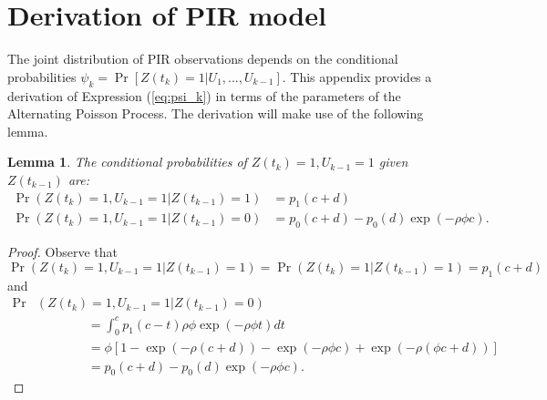 \documentclass[man, noextraspace, floatsintext]{apa6}\usepackage[]{graphicx}\usepackage[]{color}
\newcommand{\bibfile}{C:/Users/jep2963/Documents/Bibliography/Behavioral_observation-APP}
\newtheorem{lemma}{Lemma}
\begin{document}


 
\appendix

\section{Derivation of PIR model}
\label{app:PIR_derivation}

The joint distribution of PIR observations depends on the conditional probabilities $\psi_k = \Pr\left[ Z(t_k) = 1 \left| U_1,...,U_{k-1}\right.\right]$. 
This appendix provides a derivation of Expression (\ref{eq:psi_k}) in terms of the parameters of the Alternating Poisson Process. The derivation will make use of the following lemma.

\begin{lemma}
\label{lemma1}
The conditional probabilities of $Z(t_k) = 1, U_{k-1} = 1$ given $Z(t_{k-1})$ are:
\begin{align*}
\Pr\left(Z(t_k) = 1, U_{k-1} = 1 \left| Z(t_{k-1}) = 1 \right.\right) &= p_1(c + d) \\
\Pr\left(Z(t_k) = 1, U_{k-1} = 1 \left| Z(t_{k-1}) = 0 \right.\right) &= p_0(c + d) - p_0(d) \exp\left(-\rho\phi c\right).
\end{align*}
\end{lemma}

\begin{proof}
Observe that \[
\Pr\left(Z(t_k) = 1, U_{k-1} = 1 \left| Z(t_{k-1}) = 1 \right.\right) = \Pr\left(Z(t_k) = 1 \left| Z(t_{k-1}) = 1 \right.\right) = p_1(c + d) \]
and \begin{align*}
\Pr &\left(Z(t_k) = 1, U_{k-1} = 1 \left| Z(t_{k-1}) = 0 \right.\right) \\
& \qquad \qquad = \int_0^{c} p_1(c - t) \rho \phi \exp\left(-\rho\phi t\right) dt \\
& \qquad \qquad  = \phi \left[ 1 - \exp\left(- \rho (c + d)\right) - \exp\left(-\rho\phi c\right) + \exp\left(- \rho (\phi c + d)\right)\right] \\
& \qquad \qquad = p_0(c + d) - p_0(d) \exp\left(-\rho\phi c\right).
\end{align*}
\end{proof}
\end{document}
